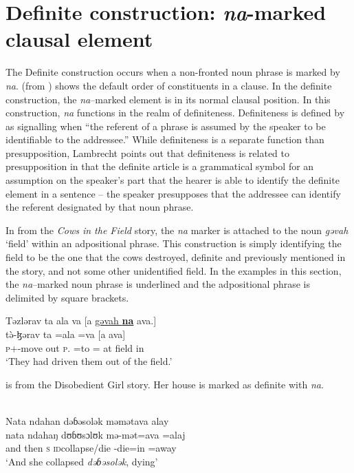 \section{Definite construction: \textit{na}-marked clausal element}\label{sec:11.4}
\hypertarget{RefHeading1213281525720847}{}
The Definite construction occurs when a non-fronted noun phrase is marked by \textit{na}.  (from ) shows the default order of constituents in a clause. In the definite construction, the \textit{na}–marked element is in its normal clausal position. In this construction, \textit{na}  functions in the realm of definiteness. Definiteness is defined by \citet[79]{Lambrecht1994} as signalling when “the referent of a phrase is assumed by the speaker to be identifiable to the addressee.” While definiteness is a separate function than presupposition, Lambrecht points out that definiteness is related to presupposition in that the definite article is a grammatical symbol for an assumption on the speaker’s part that the hearer is able to identify the definite element in a sentence -- the speaker presupposes that the addressee can identify the referent designated by that noun phrase.  

In  from the \textit{Cows in the Field} story, the \textit{na} marker is attached to the noun \textit{gəvah} ‘field’ within an adpositional phrase. This construction is simply identifying the field to be the one that the cows destroyed, definite and previously mentioned in the story, and not some other unidentified field. In the examples in this section, the \textit{na}–marked noun phrase is underlined and the adpositional phrase is delimited by square brackets.

\ea \label{ex:11:41}
Təzlərav  ta  ala  va  [a  \underline{gəvah  \textbf{na}}  ava.]\\
\gll  t\`ə-ɮərav     ta  =ala  =va    [a      ava]\\
      {\textsc{p}+{\PFV}-move out}   \textsc{p}.{\DO} =to ={\PRF}   at  field   {\PSP}  in\\
\glt  ‘They had driven them out of the field.’
\z

 is  from the Disobedient Girl story. Her house is marked as definite with \textit{na}. 

\ea \label{ex:11:42}
\\
Nata  ndahan  dəɓəsolək  məmətava  alay\\  
\gll  nata    ndahaŋ  dʊɓʊsɔlʊk  mə-mət=ava =alaj \\   
      {and then}  \textsc{s} \textsc{id}collapse/die  {\NOM}{}-die=in =away \\
\glt ‘And she collapsed \textit{dəɓəsolək}, dying’\\      
      

